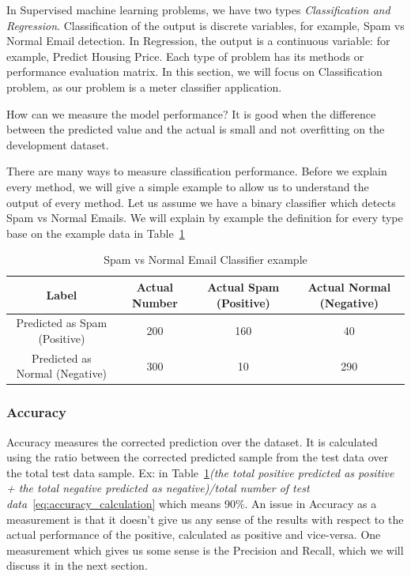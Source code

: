 In Supervised machine learning problems, we have two types \textit{Classification and Regression}. Classification of the output is discrete variables, for example, Spam vs Normal Email detection. In Regression, the output is a continuous variable: for example, Predict Housing Price. Each type of problem has its methods or performance evaluation matrix. In this section, we will focus on Classification problem, as our problem is a meter classifier application.

How can we measure the model performance? It is good when the difference between the predicted value and the actual is small and not overfitting on the development dataset.

There are many ways to measure classification performance. Before we explain every method, we will give a simple example to allow us to understand the output of every method. Let us assume we have a binary classifier which detects Spam vs Normal Emails. We will explain by example the definition for every type base on the example data in Table~\ref{Tab:EmailClassifier}

\begin{table}[t]
 \centering
 \begin{tabular}{c c c c}
  \toprule
  \textbf{Label}& \textbf{Actual Number}& \textbf{Actual Spam (Positive)} & \textbf{Actual Normal (Negative)}\\
  \midrule
  Predicted as Spam (Positive)  & 200 & \cellcolor{green!25}160 & \cellcolor{red!25}40 \\
  Predicted as Normal (Negative)   & 300  & \cellcolor{red!25}10  & \cellcolor{green!25}290\\
  \bottomrule
 \end{tabular}
 \caption{Spam vs Normal Email Classifier example}\label{Tab:EmailClassifier}
\end{table}


\subsubsection{Accuracy}

Accuracy measures the corrected prediction over the dataset. It is calculated using the ratio between the corrected predicted sample from the test data over the total test data sample. Ex: in Table~\ref{Tab:EmailClassifier}\textit{(the total positive predicted as positive + the total negative predicted as negative)/total number of test data}~\eqref{eq:accuracy_calculation} which means 90\%. An issue in Accuracy as a measurement is that it doesn’t give us any sense of the results with respect to the actual performance of the positive, calculated as positive and vice-versa. One measurement which gives us some sense is the Precision and Recall, which we will discuss it in the next section.

